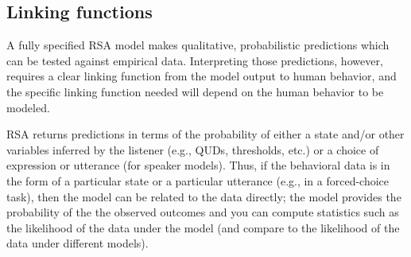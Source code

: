 \documentclass{sp}
\begin{document}
\subsection{Linking functions}

A fully specified RSA model makes qualitative, probabilistic predictions which can be tested against empirical data.
Interpreting those predictions, however, requires a clear linking function from the model output to human behavior, and the specific linking function needed will depend on the human behavior to be modeled.


RSA returns predictions in terms of the probability of either a state and/or other variables inferred by the listener (e.g., QUDs, thresholds, etc.) or a choice of expression or utterance (for speaker models).
Thus, if the behavioral data is in the form of a particular state or a particular utterance (e.g., in a forced-choice task), then the model can be related to the data directly; the model provides the probability of the the observed outcomes and you can compute statistics such as the likelihood of the data under the model (and compare to the likelihood of the data under different models). 
\end{document}
